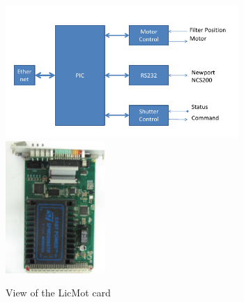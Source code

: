 \begin{itemize}
\begin{figure}[htbp]
\centering
\includegraphics[height=5cm]{figures/licmot_scheme.pdf}
\includegraphics[height=5cm]{figures/licmot.JPG}
\caption{View of the LicMot card}\label{fig:laslicmot}
\end{figure}

\end{itemize}
